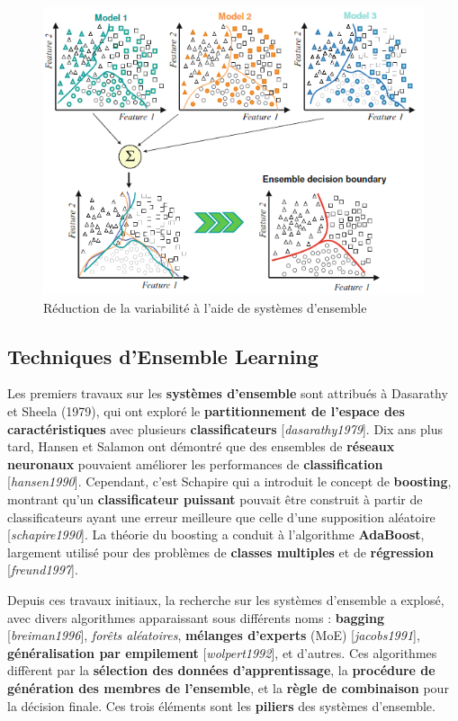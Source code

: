 \begin{figure}[h!]
	\centering
	\includegraphics[width=0.5\linewidth]{images/arr-ens}
	\caption[Réduction de la variabilité à l'aide de systèmes d'ensemble]{Réduction de la variabilité à l'aide de systèmes d'ensemble}
	\label{fig:arr-ens}
\end{figure}

\subsection{Techniques d'Ensemble Learning}

Les premiers travaux sur les \textbf{systèmes d'ensemble} sont attribués à Dasarathy et Sheela (1979), qui ont exploré le \textbf{partitionnement de l'espace des caractéristiques} avec plusieurs \textbf{classificateurs} [\textit{dasarathy1979}]. Dix ans plus tard, Hansen et Salamon ont démontré que des ensembles de \textbf{réseaux neuronaux} pouvaient améliorer les performances de \textbf{classification} [\textit{hansen1990}]. Cependant, c'est Schapire qui a introduit le concept de \textbf{boosting}, montrant qu'un \textbf{classificateur puissant} pouvait être construit à partir de classificateurs ayant une erreur meilleure que celle d'une supposition aléatoire [\textit{schapire1990}]. La théorie du boosting a conduit à l'algorithme \textbf{AdaBoost}, largement utilisé pour des problèmes de \textbf{classes multiples} et de \textbf{régression} [\textit{freund1997}].

Depuis ces travaux initiaux, la recherche sur les systèmes d'ensemble a explosé, avec divers algorithmes apparaissant sous différents noms : \textbf{bagging} [\textit{breiman1996}], \textit{forêts aléatoires}, \textbf{mélanges d'experts} (MoE) [\textit{jacobs1991}], \textbf{généralisation par empilement} [\textit{wolpert1992}], et d'autres. Ces algorithmes diffèrent par la \textbf{sélection des données d'apprentissage}, la \textbf{procédure de génération des membres de l'ensemble}, et la \textbf{règle de combinaison} pour la décision finale. Ces trois éléments sont les \textbf{piliers} des systèmes d'ensemble.

